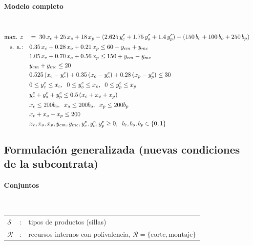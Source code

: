 \paragraph{Modelo completo}\mbox{}\\
\begin{align}
\mbox{max. } z \quad &=\; 30\,x_c + 25\,x_o + 18\,x_p 
- (2.625\,y_c^{e} + 1.75\,y_o^{e} + 1.4\,y_p^{e})
- (150\,b_c + 100\,b_o + 250\,b_p) \notag \\
\mbox{s. a.:} \quad 
& 0.35\,x_c + 0.28\,x_o + 0.21\,x_p \le 60 - y_{cm} + y_{mc} \notag \\
& 1.05\,x_c + 0.70\,x_o + 0.56\,x_p \le 150 + y_{cm} - y_{mc} \notag \\
& y_{cm} + y_{mc} \le 20 \notag \\
& 0.525\,(x_c - y_c^{e}) + 0.35\,(x_o - y_o^{e}) + 0.28\,(x_p - y_p^{e}) \le 30 \notag \\
& 0 \le y_c^{e} \le x_c,\;\; 0 \le y_o^{e} \le x_o,\;\; 0 \le y_p^{e} \le x_p \notag \\
& y_c^{e} + y_o^{e} + y_p^{e} \le 0.5\,(x_c + x_o + x_p) \notag \\
& x_c \le 200 b_c,\;\; x_o \le 200 b_o,\;\; x_p \le 200 b_p \notag \\
& x_c + x_o + x_p \le 200 \notag \\
& x_c, x_o, x_p, y_{cm}, y_{mc}, y_c^{e}, y_o^{e}, y_p^{e} \ge 0,\;\; b_c,b_o,b_p \in \{0,1\} \notag
\end{align}




\subsection{Formulación generalizada (nuevas condiciones de la subcontrata)}

\paragraph{Conjuntos}\mbox{}\\
\begin{tabular}{l c l}
    $\mathcal{S}$  & : & tipos de productos (sillas) \\
    $\mathcal{R}$  & : & recursos internos con polivalencia, $\mathcal{R}=\{\text{corte},\text{montaje}\}$ \\
\end{tabular}
\\
\\

